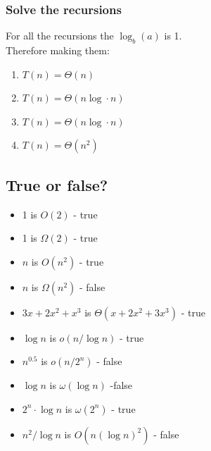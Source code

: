 \documentclass[12pt, a4paper]{article}
\begin{document}
			\subsubsection{Solve the recursions}
				For all the recursions the $\log_b(a)$ is 1.\\
				Therefore making them:
				\begin{enumerate}
					\item $T(n)=\Theta(n)$
					\item $T(n)=\Theta( n \log\cdot n)$
					\item $T(n)=\Theta(n\log \cdot n)$
					\item $T(n)=\Theta(n^2)$
				\end{enumerate}
		\subsection{True or false?}
			\begin{itemize}
					  \item 1 is $O(2)$ - true
						\item 1 is $\Omega(2)$ - true
						\item $n$ is $O(n^2)$ - true
						\item $n$ is $\Omega(n^2)$ - false
						\item $3x+2x^2+x^3$ is $\Theta(x+2x^2+3x^3)$ - true
						\item $\log n$ is $o(n/\log n)$ - true
						\item $n^{0.5}$ is $o(n/2^n)$ - false
						\item $\log n$ is $\omega(\log n)$ -false
						\item $2^n\cdot \log n$ is $\omega(2^n)$ - true
						\item $n^2/\log n$ is $O(n(\log n)^2)$ - false
			\end{itemize}
			
\end{document}
